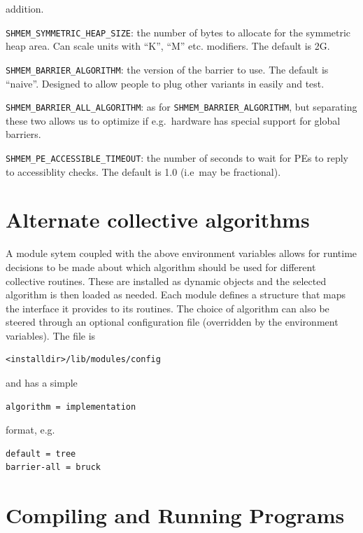 \documentclass[english]{article}
\newenvironment{lyxlist}[1]
{\begin{list}{}
{\settowidth{\labelwidth}{#1}
 \setlength{\leftmargin}{\labelwidth}
 \addtolength{\leftmargin}{\labelsep}
 \renewcommand{\makelabel}[1]{##1\hfil}}}
{\end{list}}
\begin{document}
\begin{lyxlist}{00.00.0000}
addition.
\item [{\texttt{SHMEM\_SYMMETRIC\_HEAP\_SIZE}:}] the number of bytes
to allocate for the symmetric heap area. Can scale units with ``K'',
``M'' etc. modifiers. The default is 2G.
\item [{\texttt{SHMEM\_BARRIER\_ALGORITHM}:}] the version of the
barrier to use. The default is ``naive''. Designed to allow people
to plug other variants in easily and test.
\item [{\texttt{SHMEM\_BARRIER\_ALL\_ALGORITHM}:}] as for
\texttt{SHMEM\_BARRIER\_ALGORITHM}, but separating these two allows us
to optimize if e.g.\ hardware has special support for global barriers.
\item [{\texttt{SHMEM\_PE\_ACCESSIBLE\_TIMEOUT}:}] the number of
seconds to wait for PEs to reply to accessiblity checks. The default
is 1.0 (i.e\ may be fractional).
\end{lyxlist}

\section{Alternate collective algorithms}

A module sytem coupled with the above environment variables allows for
runtime decisions to be made about which algorithm should be used for
different collective routines. These are installed as dynamic objects
and the selected algorithm is then loaded as needed. Each module
defines a structure that maps the interface it provides to its
routines. The choice of algorithm can also be steered through an
optional configuration file (overridden by the environment variables).
The file is

\begin{lstlisting}
<installdir>/lib/modules/config
\end{lstlisting}

and has a simple

\begin{lstlisting}
algorithm = implementation
\end{lstlisting}

format, e.g.\

\begin{lstlisting}
default = tree
barrier-all = bruck
\end{lstlisting}

\section{Compiling and Running Programs}
\end{document}

